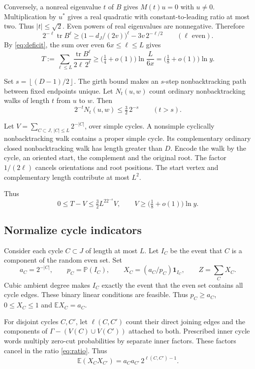 \documentclass[11pt,a4paper]{article}
\numberwithin{equation}{section}
\theoremstyle{definition}
\theoremstyle{remark}
\newcommand{\E}{\mathbb E}
\newcommand{\Prob}{\mathbb P}
\newcommand{\tr}{\operatorname{tr}}
\newcommand{\ind}{\mathbf 1}
\newcommand{\floor}[1]{\left\lfloor#1\right\rfloor}
\begin{document}
Conversely, a nonreal eigenvalue $t$ of $B$ gives $M(t)u=0$ with $u\ne0$. Multiplication by $u^*$ gives a real quadratic with constant-to-leading ratio at most two. Thus $|t|\le\sqrt2$. Even powers of real eigenvalues are nonnegative. Therefore
\[
 2^{-\ell}\tr B^\ell\ge\bigl(1-d_J/(2v)\bigr)^\ell-3v\,2^{-\ell/2}\qquad(\ell\text{ even}).
\]
By \eqref{eq:deficit}, the sum over even $6x\le\ell\le L$ gives
\[
 T:=\sum_{\ell\le L}\frac{\tr B^\ell}{2\ell\,2^\ell}\ge\bigl(\tfrac14+o(1)\bigr)\ln\frac L{6x}=\bigl(\tfrac18+o(1)\bigr)\ln y.
\]

Set $s=\floor{(D-1)/2}$. The girth bound makes an $s$-step nonbacktracking path between fixed endpoints unique. Let $N_t(u,w)$ count ordinary nonbacktracking walks of length $t$ from $u$ to $w$. Then
\begin{equation}\label{eq:walks}
 2^{-t}N_t(u,w)\le\tfrac32\,2^{-s}\qquad(t>s).
\end{equation}

Let $V=\sum_{C\subset J,\,|C|\le L}2^{-|C|}$, over simple cycles. A nonsimple cyclically nonbacktracking walk contains a proper simple cycle. Its complementary ordinary closed nonbacktracking walk has length greater than $D$. Encode the walk by the cycle, an oriented start, the complement and the original root. The factor $1/(2\ell)$ cancels orientations and root positions. The start vertex and complementary length contribute at most $L^2$.

Thus
\begin{equation}\label{eq:collisions}
 0\le T-V\le\tfrac32L^22^{-s}V,\qquad V\ge\bigl(\tfrac18+o(1)\bigr)\ln y.
\end{equation}

\subsection{Normalize cycle indicators}\label{sec:indicators}
Consider each cycle $C\subset J$ of length at most $L$. Let $I_C$ be the event that $C$ is a component of the random even set. Set
\[
 a_C=2^{-|C|},\qquad p_C=\Prob(I_C),\qquad X_C=(a_C/p_C)\ind_{I_C},\qquad Z=\sum_CX_C.
\]
Cubic ambient degree makes $I_C$ exactly the event that the even set contains all cycle edges. These binary linear conditions are feasible. Thus $p_C\ge a_C$, $0\le X_C\le1$ and $\E X_C=a_C$.

For disjoint cycles $C,C'$, let $\ell(C,C')$ count their direct joining edges and the components of $\Gamma-(V(C)\cup V(C'))$ attached to both. Prescribed inner cycle words multiply zero-cut probabilities by separate inner factors. These factors cancel in the ratio \eqref{eq:ratio}. Thus
\begin{equation}\label{eq:pair}
 \E(X_CX_{C'})=a_Ca_{C'}\,2^{\ell(C,C')-1}.
\end{equation}
\end{document}

